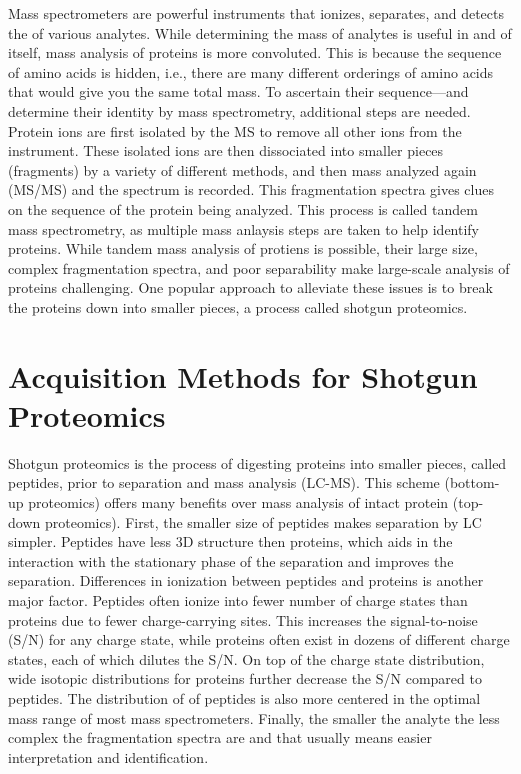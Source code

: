Mass spectrometers are powerful instruments that ionizes, separates, and detects the \mz{} of various analytes. While determining the mass of analytes is useful in and of itself, mass analysis of proteins is more convoluted. This is because the sequence of amino acids is hidden, i.e., there are many different orderings of amino acids that would give you the same total mass. To ascertain their sequence---and determine their identity by mass spectrometry, additional steps are needed. Protein ions are first isolated by the MS to remove all other ions from the instrument. These isolated ions are then dissociated into smaller pieces (fragments) by a variety of different methods, and then mass analyzed again (MS/MS) and the spectrum is recorded. This fragmentation spectra gives clues on the sequence of the protein being analyzed. This process is called tandem mass spectrometry, as multiple mass anlaysis steps are taken to help identify proteins. While tandem mass analysis of protiens is possible, their large size, complex fragmentation spectra, and poor separability make large-scale analysis of proteins challenging. One popular approach to alleviate these issues is to break the proteins down into smaller pieces, a process called shotgun proteomics.

\section{Acquisition Methods for Shotgun Proteomics}
Shotgun proteomics is the process of digesting proteins into smaller pieces, called peptides, prior to separation and mass analysis (LC-MS).  This scheme (bottom-up proteomics) offers many benefits over mass analysis of intact protein (top-down proteomics). First, the smaller size of peptides makes separation by LC simpler. Peptides have less 3D structure then proteins, which aids in the interaction with the stationary phase of the separation and improves the separation. Differences in ionization between peptides and proteins is another major factor. Peptides often ionize into fewer number of charge states than proteins due to fewer charge-carrying sites. This increases the signal-to-noise (S/N) for any charge state, while proteins often exist in dozens of different charge states, each of which dilutes the S/N. On top of the charge state distribution, wide isotopic distributions for proteins further decrease the S/N compared to peptides. The distribution of \mz{} of peptides is also more centered in the optimal mass range of most mass spectrometers. Finally, the smaller the analyte the less complex the fragmentation spectra are and that usually means easier interpretation and identification. 

